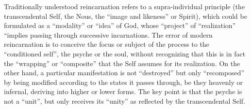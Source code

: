 \begin{footnotesize}
\begin{sffamily}
Traditionally understood reincarnation refers to a supra-individual principle (the transcendental Self, the Nous, the ``image and likeness'' or Spirit), which could be formulated as a ``modality'' or ``idea'' of God, whose ``project'' of ``realization'' ``implies passing through successive incarnations. The error of modern reincarnation is to conceive the focus or subject of the process to the ``conditioned self'', the psyche or the soul, without recognizing that this is in fact the ``wrapping'' or ``composite'' that the Self assumes for its realization. On the other hand, a particular manifestation is not ``destroyed'' but only ``recomposed'' by being modified according to the states it passes through, be they heavenly or infernal, deriving into higher or lower forms. The key point is that the psyche is not a ``unit'', but only receives its ``unity'' as reflected by the transcendental Self.


\hfill

\end{sffamily}
\end{footnotesize}

